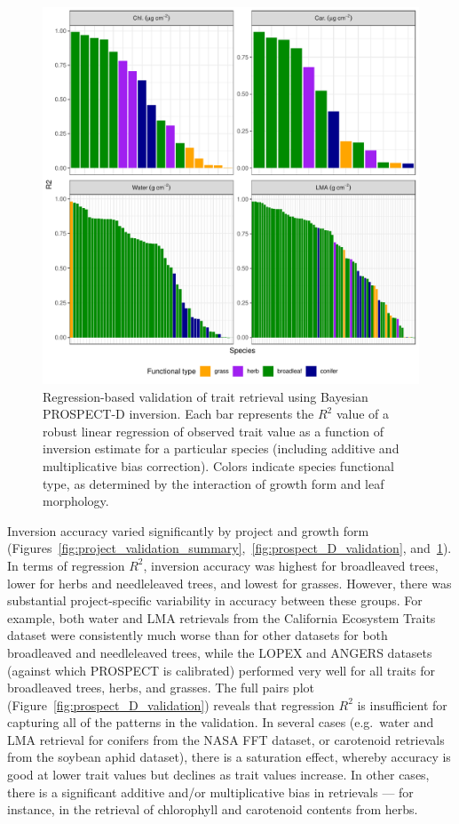 \begin{figure}
  \centering
  \includegraphics[width=\textwidth]{figures/r2_by_gf.pdf}
  \caption{%
    Regression-based validation of trait retrieval using Bayesian PROSPECT-D inversion.
    Each bar represents the $R^2$ value of a robust linear regression of observed trait value as a function of inversion estimate for a particular species (including additive and multiplicative bias correction).
    Colors indicate species functional type, as determined by the interaction of growth form and leaf morphology.
  }\label{fig:prospect_D_r2}
\end{figure}

Inversion accuracy varied significantly by project and growth form (Figures~\ref{fig:project_validation_summary},~\ref{fig:prospect_D_validation}, and~\ref{fig:prospect_D_r2}).
In terms of regression $R^2$, inversion accuracy was highest for broadleaved trees, lower for herbs and needleleaved trees, and lowest for grasses.
However, there was substantial project-specific variability in accuracy between these groups.
For example, both water and LMA retrievals from the California Ecosystem Traits dataset were consistently much worse than for other datasets for both broadleaved and needleleaved trees, while the LOPEX and ANGERS datasets (against which PROSPECT is calibrated) performed very well for all traits for broadleaved trees, herbs, and grasses.
The full pairs plot (Figure~\ref{fig:prospect_D_validation}) reveals that regression $R^2$ is insufficient for capturing all of the patterns in the validation.
In several cases (e.g.\ water and LMA retrieval for conifers from the NASA FFT dataset, or carotenoid retrievals from the soybean aphid dataset), there is a saturation effect, whereby accuracy is good at lower trait values but declines as trait values increase.
In other cases, there is a significant additive and/or multiplicative bias in retrievals --- for instance, in the retrieval of chlorophyll and carotenoid contents from herbs.

